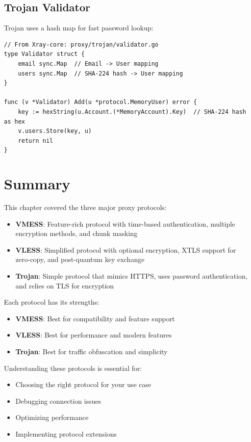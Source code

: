 \subsection{Trojan Validator}

Trojan uses a hash map for fast password lookup:

\begin{verbatim}
// From Xray-core: proxy/trojan/validator.go
type Validator struct {
    email sync.Map  // Email -> User mapping
    users sync.Map  // SHA-224 hash -> User mapping
}

func (v *Validator) Add(u *protocol.MemoryUser) error {
    key := hexString(u.Account.(*MemoryAccount).Key)  // SHA-224 hash as hex
    v.users.Store(key, u)
    return nil
}
\end{verbatim}

\section{Summary}

This chapter covered the three major proxy protocols:

\begin{itemize}
    \item \textbf{VMESS}: Feature-rich protocol with time-based authentication, multiple encryption methods, and chunk masking
    \item \textbf{VLESS}: Simplified protocol with optional encryption, XTLS support for zero-copy, and post-quantum key exchange
    \item \textbf{Trojan}: Simple protocol that mimics HTTPS, uses password authentication, and relies on TLS for encryption
\end{itemize}

Each protocol has its strengths:
\begin{itemize}
    \item \textbf{VMESS}: Best for compatibility and feature support
    \item \textbf{VLESS}: Best for performance and modern features
    \item \textbf{Trojan}: Best for traffic obfuscation and simplicity
\end{itemize}

Understanding these protocols is essential for:
\begin{itemize}
    \item Choosing the right protocol for your use case
    \item Debugging connection issues
    \item Optimizing performance
    \item Implementing protocol extensions
\end{itemize}

